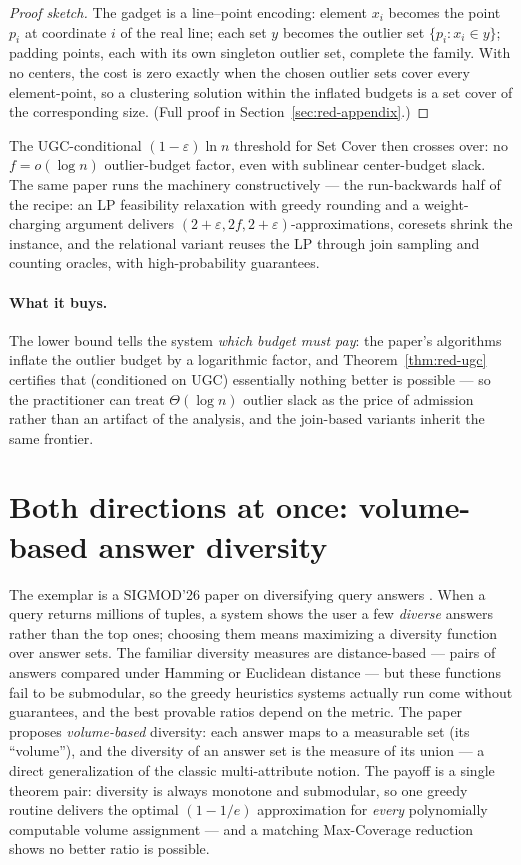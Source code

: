 \begin{proof}[Proof sketch]
The gadget is a line--point encoding: element $x_i$ becomes the point $p_i$ at
coordinate $i$ of the real line; each set $y$ becomes the outlier set $\{p_i : x_i \in
y\}$; padding points, each with its own singleton outlier set, complete the family.
With no centers, the cost is zero exactly when the chosen outlier sets cover every
element-point, so a clustering solution within the inflated budgets is a set cover of
the corresponding size. (Full proof in Section~\ref{sec:red-appendix}.)
\end{proof}

The UGC-conditional $(1-\varepsilon)\ln n$ threshold for Set Cover then crosses over:
no $f = o(\log n)$ outlier-budget factor, even with sublinear center-budget slack.
The same paper runs the machinery constructively --- the run-backwards half of the
recipe: an LP feasibility relaxation with greedy rounding and a weight-charging
argument delivers $(2 + \varepsilon, 2f, 2 + \varepsilon)$-approximations, coresets
shrink the instance, and the relational variant reuses the LP through join sampling
and counting oracles, with high-probability guarantees.

\paragraph{What it buys.}
The lower bound tells the system \emph{which budget must pay}: the paper's algorithms
inflate the outlier budget by a logarithmic factor, and Theorem~\ref{thm:red-ugc}
certifies that (conditioned on UGC) essentially nothing better is possible --- so the
practitioner can treat $\Theta(\log n)$ outlier slack as the price of admission rather
than an artifact of the analysis, and the join-based variants inherit the same
frontier.

\section{Both directions at once: volume-based answer diversity}
\label{sec:red-diversity}

The exemplar is a SIGMOD'26 paper on diversifying query answers \citep{sigmod26-350}.
When a query returns millions of tuples, a system shows the user a few
\emph{diverse} answers rather than the top ones; choosing them means maximizing a
diversity function over answer sets. The familiar diversity measures are
distance-based --- pairs of answers compared under Hamming or Euclidean distance ---
but these functions fail to be submodular, so the greedy heuristics systems actually
run come without guarantees, and the best provable ratios depend on the metric. The
paper proposes \emph{volume-based} diversity: each answer maps to a measurable set (its
``volume''), and the diversity of an answer set is the measure of its union --- a
direct generalization of the classic multi-attribute notion. The payoff is a single
theorem pair: diversity is always monotone and submodular, so one greedy routine
delivers the optimal $(1 - 1/e)$ approximation for \emph{every} polynomially computable
volume assignment --- and a matching Max-Coverage reduction shows no better ratio is
possible.

